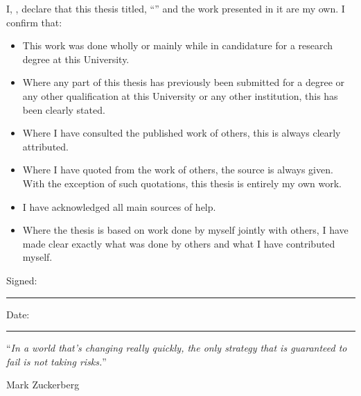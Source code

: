 \documentclass[
11pt, %
english, %
singlespacing, %
headsepline, %
]{MastersDoctoralThesis} %
\begin{document}
\begin{declaration}
\addchaptertocentry{\authorshipname} %
\noindent I, \authorname, declare that this thesis titled, \enquote{\ttitle} and the work presented in it are my own. I confirm that:

\begin{itemize} 
\item This work was done wholly or mainly while in candidature for a research degree at this University.
\item Where any part of this thesis has previously been submitted for a degree or any other qualification at this University or any other institution, this has been clearly stated.
\item Where I have consulted the published work of others, this is always clearly attributed.
\item Where I have quoted from the work of others, the source is always given. With the exception of such quotations, this thesis is entirely my own work.
\item I have acknowledged all main sources of help.
\item Where the thesis is based on work done by myself jointly with others, I have made clear exactly what was done by others and what I have contributed myself.\\
\end{itemize}
 
\noindent Signed:\\
\rule[0.5em]{25em}{0.5pt} %
 
\noindent Date:\\
\rule[0.5em]{25em}{0.5pt} %
\end{declaration}

\cleardoublepage


\vspace*{0.2\textheight}

\noindent\enquote{\itshape In a world that's changing really quickly, the only strategy that is guaranteed to fail is not taking risks.}\bigbreak

\hfill Mark Zuckerberg

\end{document}

